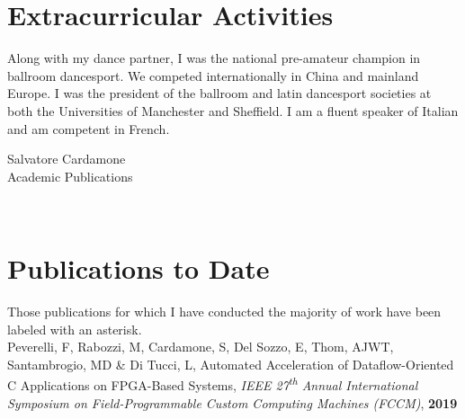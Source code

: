 \documentclass[11pt]{article} %
\begin{document}
\section{Extracurricular Activities} 

Along with my dance partner, I was the national pre-amateur champion in ballroom dancesport. We competed internationally in China and mainland Europe. I was the president of the ballroom and latin dancesport societies at both the Universities of Manchester and Sheffield. I am a fluent speaker of Italian and am competent in French.

\newpage

\begin{minipage}[t]{0.49\textwidth}
\vspace{0pt}
{\huge{Salvatore Cardamone}}\\ %
{\color{headings} \Large{Academic Publications}}
\end{minipage}\hfill
\begin{minipage}[t]{0.49\textwidth}
\vspace{2cm}
\end{minipage}\\
\section{Publications to Date} 

Those publications for which I have conducted the majority of work have been labeled with an asterisk.\\

Peverelli, F, Rabozzi, M, Cardamone, S, Del Sozzo, E, Thom, AJWT, Santambrogio, MD \& Di Tucci, L, Automated Acceleration of Dataflow-Oriented C Applications on FPGA-Based Systems, \textit{IEEE 27\textsuperscript{th} Annual International Symposium on Field-Programmable Custom Computing Machines (FCCM)}, \textbf{2019}\\
\end{document}
